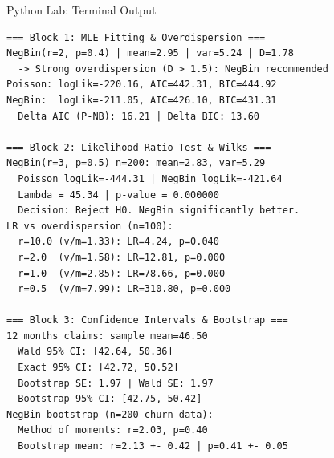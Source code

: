 \documentclass[aspectratio=169,xcolor={dvipsnames,table}]{beamer}
\begin{document}
\begin{frame}[fragile]{Python Lab: Terminal Output}
	\vspace{-0.1cm}
	\begin{block}{}
		\fontsize{4pt}{5pt}\selectfont
		\begin{verbatim}
=== Block 1: MLE Fitting & Overdispersion ===
NegBin(r=2, p=0.4) | mean=2.95 | var=5.24 | D=1.78
  -> Strong overdispersion (D > 1.5): NegBin recommended
Poisson: logLik=-220.16, AIC=442.31, BIC=444.92
NegBin:  logLik=-211.05, AIC=426.10, BIC=431.31
  Delta AIC (P-NB): 16.21 | Delta BIC: 13.60

=== Block 2: Likelihood Ratio Test & Wilks ===
NegBin(r=3, p=0.5) n=200: mean=2.83, var=5.29
  Poisson logLik=-444.31 | NegBin logLik=-421.64
  Lambda = 45.34 | p-value = 0.000000
  Decision: Reject H0. NegBin significantly better.
LR vs overdispersion (n=100):
  r=10.0 (v/m=1.33): LR=4.24, p=0.040
  r=2.0  (v/m=1.58): LR=12.81, p=0.000
  r=1.0  (v/m=2.85): LR=78.66, p=0.000
  r=0.5  (v/m=7.99): LR=310.80, p=0.000

=== Block 3: Confidence Intervals & Bootstrap ===
12 months claims: sample mean=46.50
  Wald 95% CI: [42.64, 50.36]
  Exact 95% CI: [42.72, 50.52]
  Bootstrap SE: 1.97 | Wald SE: 1.97
  Bootstrap 95% CI: [42.75, 50.42]
NegBin bootstrap (n=200 churn data):
  Method of moments: r=2.03, p=0.40
  Bootstrap mean: r=2.13 +- 0.42 | p=0.41 +- 0.05
		\end{verbatim}
	\end{block}
\end{frame}
\end{document}
